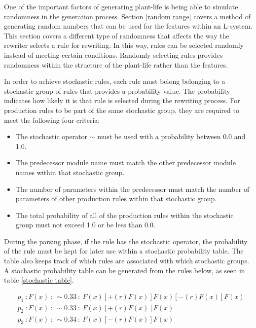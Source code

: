 One of the important factors of generating plant-life is being able to simulate randomness in the generation process. Section \ref{random range} covers a method of generating random numbers that can be used for the features within an L-system. This section covers a different type of randomness that affects the way the rewriter selects a rule for rewriting. In this way, rules can be selected randomly instead of meeting certain conditions. Randomly selecting rules provides randomness within the structure of the plant-life rather than the features.

In order to achieve stochastic rules, each rule must belong belonging to a stochastic group of rules that provides a probability value. The probability indicates how likely it is that rule is selected during the rewriting process. For production rules to be part of the same stochastic group, they are required to meet the following four criteria: 

\begin{itemize}
\item The stochastic operator $\sim$ must be used with a probability between 0.0 and 1.0.
\item The predecessor module name must match the other predecessor module names within that stochastic group.
\item The number of parameters within the predecessor must match the number of parameters of other production rules within that stochastic group.
\item The total probability of all of the production rules within the stochastic group must not exceed 1.0 or be less than 0.0.
\end{itemize}

During the parsing phase, if the rule has the stochastic operator, the probability of the rule must be kept for later use within a stochastic probability table. The table also keeps track of which rules are associated with which stochastic groups. A stochastic probability table can be generated from the rules below, as seen in table \ref{stochastic table}. 

\begin{equation} \label{stochastic implementation example}
\begin{aligned}
	&p_1~ :  F(x)~ :~ \sim 0.33 ~ :~ F(x)[+(r)F(x)]F(x)[-(r)F(x)]F(x)\\
	&p_2~ :  F(x)~ :~ \sim 0.33 ~ :~ F(x)[+(r)F(x)]F(x)\\
	&p_3~ :  F(x)~ :~ \sim 0.34 ~ :~ F(x)[-(r)F(x)]F(x)\\
\end{aligned}
\end{equation}

